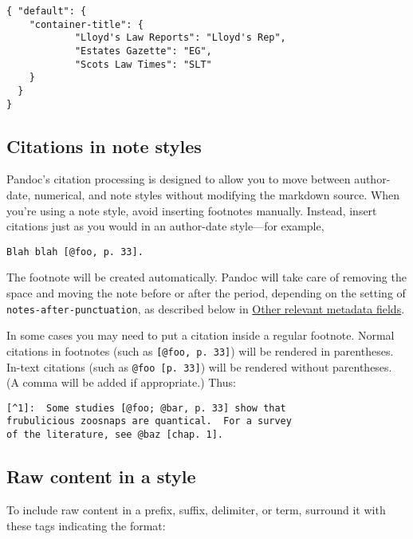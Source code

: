\documentclass[
]{article}
\begin{document}
\begin{verbatim}
{ "default": {
    "container-title": {
            "Lloyd's Law Reports": "Lloyd's Rep",
            "Estates Gazette": "EG",
            "Scots Law Times": "SLT"
    }
  }
}
\end{verbatim}

\hypertarget{citations-in-note-styles}{%
\subsection{Citations in note styles}\label{citations-in-note-styles}}

Pandoc's citation processing is designed to allow you to move between
author-date, numerical, and note styles without modifying the markdown
source. When you're using a note style, avoid inserting footnotes
manually. Instead, insert citations just as you would in an author-date
style---for example,

\begin{verbatim}
Blah blah [@foo, p. 33].
\end{verbatim}

The footnote will be created automatically. Pandoc will take care of
removing the space and moving the note before or after the period,
depending on the setting of \texttt{notes-after-punctuation}, as
described below in
\protect\hyperlink{other-relevant-metadata-fields}{Other relevant
metadata fields}.

In some cases you may need to put a citation inside a regular footnote.
Normal citations in footnotes (such as \texttt{{[}@foo,\ p.\ 33{]}})
will be rendered in parentheses. In-text citations (such as
\texttt{@foo\ {[}p.\ 33{]}}) will be rendered without parentheses. (A
comma will be added if appropriate.) Thus:

\begin{verbatim}
[^1]:  Some studies [@foo; @bar, p. 33] show that
frubulicious zoosnaps are quantical.  For a survey
of the literature, see @baz [chap. 1].
\end{verbatim}

\hypertarget{raw-content-in-a-style}{%
\subsection{Raw content in a style}\label{raw-content-in-a-style}}

To include raw content in a prefix, suffix, delimiter, or term, surround
it with these tags indicating the format:
\end{document}
